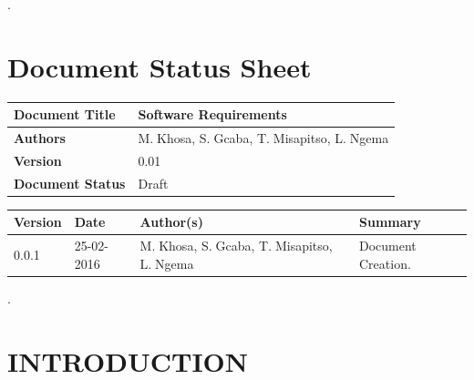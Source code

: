 \documentclass[10pt,onecolumn]{MainDocument}
\begin{document}
\begin{titlepage}
		\vfill %
		
	\end{titlepage}
	
	

	\pagestyle{plain}.
	\tableofcontents 
	
	\newpage
	
	
	
\section*{Document Status Sheet}
	
	\begin{center}
		\begin{tabular}{ | p{5cm} | p{7cm} |}
			\hline
			\textbf{Document Title}& Software Requirements\\ \hline
			\textbf{Authors} & M.$\;$Khosa, S.$\;$Gcaba, T.$\;$Misapitso, L.$\;$Ngema \\ \hline
			\textbf{Version} & 0.01 \\ \hline
			\textbf{Document Status} & Draft  \\ \hline
			
		\end{tabular}
	\end{center}
	
	
	\begin{center}
		\begin{tabular}{ | p{2cm} | p{3cm} | p{5cm} | p{5cm} |}
			\hline
			\textbf{Version}& \textbf{Date}& \textbf{Author(s)} & \textbf{Summary} \\ \hline
			0.0.1 & 25-02-2016 & M.$\;$Khosa, S.$\;$Gcaba, T.$\;$Misapitso, L.$\;$Ngema& Document Creation. \\ \hline
			
		\end{tabular}
	\end{center}
	
	\newpage
	
	
	\pagestyle{plain}.

%
\section{INTRODUCTION}
\end{document}
